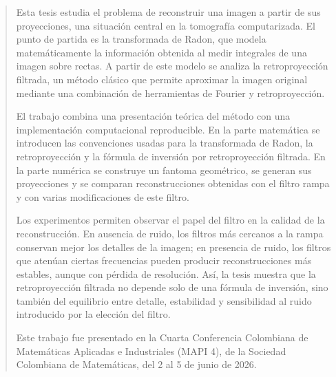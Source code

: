 \documentclass[
12pt,
spanish,
singlespacing,
headsepline
]{MastersDoctoralThesis}
\begin{document}
\begin{abstract}
\addchaptertocentry{\abstractname}
Esta tesis estudia el problema de reconstruir una imagen a partir de sus proyecciones, una situación central en la tomografía computarizada. El punto de partida es la transformada de Radon, que modela matemáticamente la información obtenida al medir integrales de una imagen sobre rectas. A partir de este modelo se analiza la retroproyección filtrada, un método clásico que permite aproximar la imagen original mediante una combinación de herramientas de Fourier y retroproyección.

El trabajo combina una presentación teórica del método con una implementación computacional reproducible. En la parte matemática se introducen las convenciones usadas para la transformada de Radon, la retroproyección y la fórmula de inversión por retroproyección filtrada. En la parte numérica se construye un fantoma geométrico, se generan sus proyecciones y se comparan reconstrucciones obtenidas con el filtro rampa y con varias modificaciones de este filtro.

Los experimentos permiten observar el papel del filtro en la calidad de la reconstrucción. En ausencia de ruido, los filtros más cercanos a la rampa conservan mejor los detalles de la imagen; en presencia de ruido, los filtros que atenúan ciertas frecuencias pueden producir reconstrucciones más estables, aunque con pérdida de resolución. Así, la tesis muestra que la retroproyección filtrada no depende solo de una fórmula de inversión, sino también del equilibrio entre detalle, estabilidad y sensibilidad al ruido introducido por la elección del filtro.

Este trabajo fue presentado en la Cuarta Conferencia Colombiana de Matemáticas Aplicadas e Industriales (MAPI 4), de la Sociedad Colombiana de Matemáticas, del 2 al 5 de junio de 2026.
\end{abstract}


\mainmatter
\pagestyle{thesis}

\tableofcontents









\setlength{\emergencystretch}{3em}
\sloppy

{%
\small
\setlength{\bibitemsep}{0pt}
\setlength{\bibparsep}{0pt}
\printbibliography[heading=bibintoc,title={Bibliografía}]
}

\end{document}
